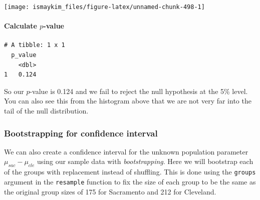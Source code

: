 \documentclass[12pt,]{krantz}
\makeatletter
\newenvironment{Shaded}{\begin{snugshade}}{\end{snugshade}}
\newcommand{\KeywordTok}[1]{\textcolor[rgb]{0.27,0.27,0.27}{\textbf{#1}}}
\newcommand{\DataTypeTok}[1]{\textcolor[rgb]{0.27,0.27,0.27}{#1}}
\newcommand{\DecValTok}[1]{\textcolor[rgb]{0.06,0.06,0.06}{#1}}
\newcommand{\StringTok}[1]{\textcolor[rgb]{0.5,0.5,0.5}{#1}}
\newcommand{\OperatorTok}[1]{\textcolor[rgb]{0.43,0.43,0.43}{\textbf{#1}}}
\newcommand{\NormalTok}[1]{#1}
\let\oldparagraph\paragraph
\renewcommand{\paragraph}[1]{\oldparagraph{#1}\mbox{}}
\newenvironment{kframe}{%
\medskip{}
\setlength{\fboxsep}{.8em}
 \def\at@end@of@kframe{}%
 \ifinner\ifhmode%
  \def\at@end@of@kframe{\end{minipage}}%
  \begin{minipage}{\columnwidth}%
 \fi\fi%
 \def\FrameCommand##1{\hskip\@totalleftmargin \hskip-\fboxsep
 \colorbox{shadecolor}{##1}\hskip-\fboxsep
     \hskip-\linewidth \hskip-\@totalleftmargin \hskip\columnwidth}%
 \MakeFramed {\advance\hsize-\width
   \@totalleftmargin\z@ \linewidth\hsize
   \@setminipage}}%
 {\par\unskip\endMakeFramed%
 \at@end@of@kframe}
\renewenvironment{Shaded}{\begin{kframe}}{\end{kframe}}
\makeatother
\begin{document}
\begin{center}\texttt{[image: ismaykim\_files/figure-latex/unnamed-chunk-498-1]} \end{center}

\paragraph{\texorpdfstring{Calculate
\(p\)-value}{Calculate p-value}}\label{calculate-p-value-3}

\begin{Shaded}
\end{Shaded}

\begin{verbatim}
# A tibble: 1 x 1
  p_value
    <dbl>
1   0.124
\end{verbatim}

So our \(p\)-value is 0.124 and we fail to reject the null hypothesis at
the 5\% level. You can also see this from the histogram above that we
are not very far into the tail of the null distribution.

\subsubsection*{Bootstrapping for confidence
interval}\label{bootstrapping-for-confidence-interval-3}

We can also create a confidence interval for the unknown population
parameter \(\mu_{sac} - \mu_{cle}\) using our sample data with
\emph{bootstrapping}. Here we will bootstrap each of the groups with
replacement instead of shuffling. This is done using the \texttt{groups}
argument in the \texttt{resample} function to fix the size of each group
to be the same as the original group sizes of 175 for Sacramento and 212
for Cleveland.

\begin{Shaded}
\end{Shaded}
\end{document}
